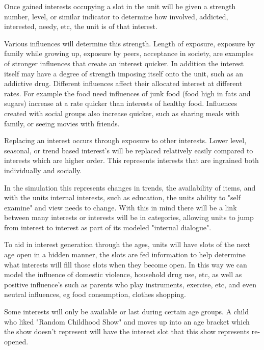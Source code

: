 Once gained interests occupying a slot in the unit will be given a strength number, level, or similar indicator to determine how involved, addicted, interested, needy, etc, the unit is of that interest. 

Various influences will determine this strength. Length of exposure, exposure by family while growing up, exposure by peers, acceptance in society, are examples of stronger influences that create an interest quicker. In addition the interest itself may have a degree of strength imposing itself onto the unit, such as an addictive drug. Different influences affect their allocated interest at different rates. For example the food need influences of junk food (food high in fats and sugars) increase at a rate quicker than interests of healthy food. Influences created with social groups also increase quicker, such as sharing meals with family, or seeing movies with friends.





Replacing an interest occurs through exposure to other interests. Lower level, seasonal, or trend based interest's will be replaced relatively easily compared to interests which are higher order. This represents interests that are ingrained both individually and socially. 

In the simulation this represents changes in trends, the availability of items, and with the units internal interests, such as education, the units ability to "self examine" and view needs to change. With this in mind there will be a link between many interests or interests will be in categories, allowing units to jump from interest to interest as part of its modeled "internal dialogue".

To aid in interest generation through the ages, units will have slots of the next age open in a hidden manner, the slots are fed information to help determine what interests will fill those slots when they become open. In this way we can model the influence of domestic violence, household drug use, etc, as well as positive influence's such as parents who play instruments, exercise, etc, and even neutral influences, eg food consumption, clothes shopping.

Some interests will only be available or last during certain age groups. A child who liked "Random Childhood Show" and moves up into an age bracket which the show doesn't represent will have the interest slot that this show represents re-opened. 

